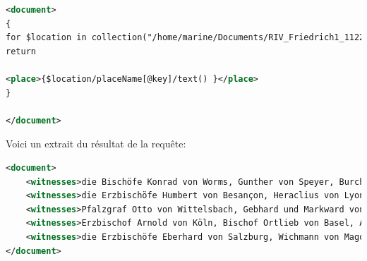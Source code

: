 \lstset{style=mystyle}
\begin{lstlisting}[language=XML]
<document>
{
for $location in collection("/home/marine/Documents/RIV_Friedrich1_1122-1190/")//issuePlace
return

<place>{$location/placeName[@key]/text() }</place>
}

</document>
\end{lstlisting}

\noindent Voici un extrait du résultat de la requête:\\
\lstset{style=mystyle}
\begin{lstlisting}[language=XML]
<document>
    <witnesses>die Bischöfe Konrad von Worms, Gunther von Speyer, Burchard von Straßburg, Konrad von Augsburg, Dompropst Walter von Köln, Dekan Albert (von Köln), Propst Diepold von Xanten, Abt Nikolaus von Siegburg (), die Pröpste Arnold vom Andreasstift (in Köln), Ulrich von Soest (), die Herzoge Heinrich von Bayern, Heinrich von Sachsen und viele Fürsten; von den Kölner Hintersassen (): Vogt Hermann (von Eppendorf), Heinrich von Volmarstein (), Heinrich von Alpen (), Truchseß Adolf, Schenk Randolf, Raboto von Odenkirchen, Amalrich von Wormersdorf ()</witnesses>
    <witnesses>die Erzbischöfe Humbert von Besançon, Heraclius von Lyon, Petrus von Tarentaise, Bischof Wilhelm () von Novara, Herzog Matthäus von Lothringen, die Grafen Volmar von Saarwerden (), Stephan von Herrlingen (), Albert von Dillingen</witnesses>
    <witnesses>Pfalzgraf Otto von Wittelsbach, Gebhard und Markward von Leuchtenberg und die Brüder Gottfried, Adalbero und Konrad von Salksdorf</witnesses>
    <witnesses>Erzbischof Arnold von Köln, Bischof Ortlieb von Basel, Abt Wibald von Corvey, die Herzoge Heinrich von Sachsen, Welf von Spoleto, die Pfalzgrafen Otto von Wittelsbach, Friedrich von Tubingen ()</witnesses><witnesses>Erzbischof Wichmann von Magdeburg, Bischof Gebhard von Würzburg, die Äbte Markward von Fulda, Adam von Ebrach, Herzog Friedrich von Schwaben, Landgraf Ludwig (von Thüringen), Pfalzgraf Otto der Jüngere von Wittelsbach und sein Bruder Friedrich, die Grafen Gerard von Bergtheim, Poppo von Henneberg () sowie sein Bruder Berthold und Goswin von Tecklenburg (), Markward von Grumbach, Konrad von Pfitzingen (), Giso von Hildenburg (), Sigeboto von Zimmern ()</witnesses>
    <witnesses>die Erzbischöfe Eberhard von Salzburg, Wichmann von Magdeburg, die Bischöfe Hartwig von Regensburg, Eberhard von Bamberg, Konrad von Passau, Otto von Freising (), Daniel von Prag, die Herzoge Heinrich von Österreich, Friedrich von Schwaben, Landgraf Ludwig von Thüringen, die Markgrafen Albrecht (der Bär) von Sachsen, Otto von Meißen, die Pfalzgrafen Otto und Friedrich (von Wittelsbach)</witnesses>
</document>
\end{lstlisting}

